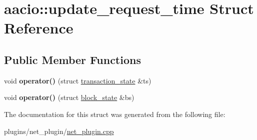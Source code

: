 \hypertarget{structaacio_1_1update__request__time}{}\section{aacio\+:\+:update\+\_\+request\+\_\+time Struct Reference}
\label{structaacio_1_1update__request__time}
\subsection*{Public Member Functions}
\begin{DoxyCompactItemize}
\item 
\mbox{\label{structaacio_1_1update__request__time_abd30b6bf68bd6ed4ce781d7afd1c72c0}} 
void {\bfseries operator()} (struct \mbox{\hyperlink{structaacio_1_1transaction__state}{transaction\+\_\+state}} \&ts)
\item 
\mbox{\label{structaacio_1_1update__request__time_a9cc2e9e62699ad2ca85f2748d1f28cf7}} 
void {\bfseries operator()} (struct \mbox{\hyperlink{structaacio_1_1block__state}{block\+\_\+state}} \&bs)
\end{DoxyCompactItemize}


The documentation for this struct was generated from the following file\+:\begin{DoxyCompactItemize}
\item 
plugins/net\+\_\+plugin/\mbox{\hyperlink{net__plugin_8cpp}{net\+\_\+plugin.\+cpp}}\end{DoxyCompactItemize}
